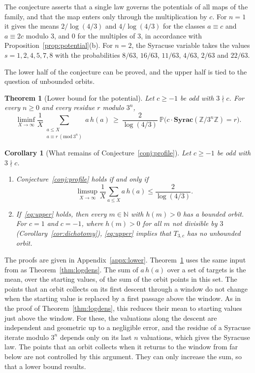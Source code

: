 \documentclass[12pt]{amsart}
\newtheorem{theorem}{Theorem}
\newtheorem{corollary}{Corollary}
\theoremstyle{definition}
\theoremstyle{remark}
\newcommand{\N}{\mathbb{N}}
\begin{document}
The conjecture asserts that a single law governs the potentials of all maps of the family, and that the map enters only through the multiplication by $c$. For $n=1$ it gives the means $2/\log(4/3)$ and $4/\log(4/3)$ for the classes $a\equiv c$ and $a\equiv2c$ modulo $3$, and $0$ for the multiples of $3$, in accordance with Proposition~\ref{prop:potential}(b). For $n=2$, the Syracuse variable takes the values $s=1,2,4,5,7,8$ with the probabilities $8/63$, $16/63$, $11/63$, $4/63$, $2/63$ and $22/63$.

The lower half of the conjecture can be proved, and the upper half is tied to the question of unbounded orbits.

\begin{theorem}[Lower bound for the potential]
\label{thm:lower}
Let $c\ge-1$ be odd with $3\nmid c$. For every $n\ge0$ and every residue $r$ modulo $3^n$,
\[
\liminf_{X\to\infty}\frac1X\sum_{\substack{a\le X\\ a\equiv r\ (\mathrm{mod}\ 3^n)}}a\,h(a)\ \ge\ \frac{2}{\log(4/3)}\ \mathbb P\bigl(c\cdot\mathbf{Syrac}(\mathbb Z/3^n\mathbb Z)=r\bigr).
\]
\end{theorem}

\begin{corollary}[What remains of Conjecture~\ref{conj:profile}]
\label{cor:remains}
Let $c\ge-1$ be odd with $3\nmid c$.
\begin{enumerate}[label=(\alph*)]
	\item Conjecture~\ref{conj:profile} holds if and only if
	\begin{equation}
	\label{eq:upper}
	\limsup_{X\to\infty}\frac1X\sum_{a\le X}a\,h(a)\le\frac{2}{\log(4/3)}.
	\end{equation}
	\item If~\eqref{eq:upper} holds, then every $m\in\N$ with $h(m)>0$ has a bounded orbit. For $c=1$ and $c=-1$, where $h(m)>0$ for all $m$ not divisible by $3$ (Corollary~\ref{cor:dichotomy}), \eqref{eq:upper} implies that $T_{3,c}$ has no unbounded orbit.
\end{enumerate}
\end{corollary}

The proofs are given in Appendix~\ref{appx:lower}. Theorem~\ref{thm:lower} uses the same input from \cite{GGM_2025} as Theorem~\ref{thm:logdens}. The sum of $a\,h(a)$ over a set of targets is the mean, over the starting values, of the sum of the orbit points in this set. The points that an orbit collects on its first descent through a window do not change when the starting value is replaced by a first passage above the window. As in the proof of Theorem~\ref{thm:logdens}, this reduces their mean to starting values just above the window. For these, the valuations along the descent are independent and geometric up to a negligible error, and the residue of a Syracuse iterate modulo $3^n$ depends only on its last $n$ valuations, which gives the Syracuse law. The points that an orbit collects when it returns to the window from far below are not controlled by this argument. They can only increase the sum, so that a lower bound results.
\end{document}

